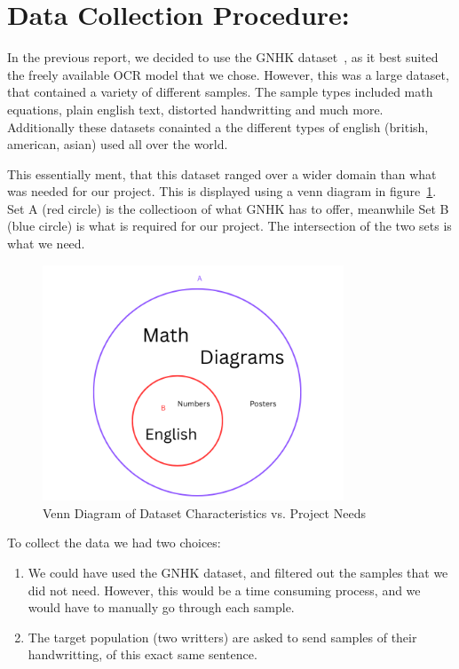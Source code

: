 \documentclass[twoside,a4paper]{article}
\begin{document}
\section{Data Collection Procedure: }
In the previous report, we decided to use the GNHK dataset~\cite{Lee2021}, as it best suited the freely available OCR model that we chose. However, this was a large dataset, that contained
a variety of different samples. The sample types included math equations, plain english text, distorted handwritting and much more. Additionally these datasets conainted a the different types of english (british, american, asian) used all over the world.

This essentially ment, that this dataset ranged over a wider domain than what was needed for our project. This is displayed using 
a venn diagram in figure~\ref{fig:venn_diagram}. Set A (red circle) is the collectioon of what GNHK has to offer, meanwhile Set B (blue circle) is
what is required for our project. The intersection of the two sets is what we need.
\begin{figure}[H]
  \centering
  \includegraphics[width=0.8\textwidth]{VennDiagram_WhatWeNeed.png}
  \caption{Venn Diagram of Dataset Characteristics vs. Project Needs}
  \label{fig:venn_diagram}
\end{figure}

To collect the data we had two choices: 
\begin{enumerate}
  \item We could have used the GNHK dataset, and filtered out the samples that we did not need. However, this would be a time consuming process, and we would have to manually go through each sample.
  \item The target population (two writters) are asked to send samples of their handwritting, of this exact same sentence. 
\end{enumerate}
\end{document}
